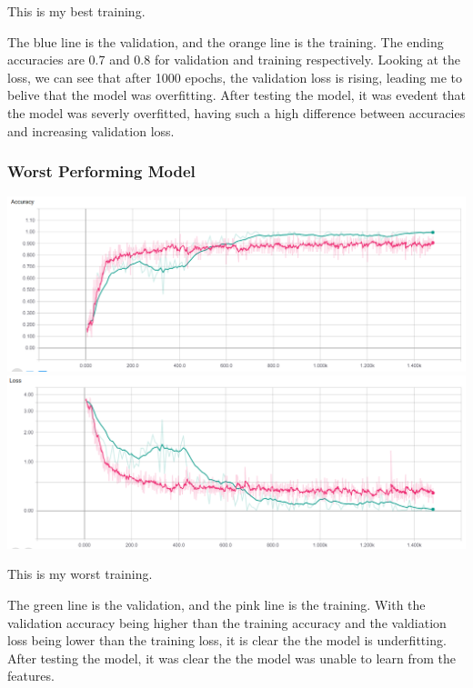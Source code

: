 \documentclass[11pt]{article}
\makeatletter
\def\maxwidth{\ifdim\Gin@nat@width>\linewidth\linewidth
    \else\Gin@nat@width\fi}
\let\Oldincludegraphics\includegraphics
\renewcommand{\includegraphics}[1]{\Oldincludegraphics[width=.8\maxwidth]{#1}}
\makeatother
\begin{document}
    This is my best training.

The blue line is the validation, and the orange line is the training.
The ending accuracies are 0.7 and 0.8 for validation and training
respectively. Looking at the loss, we can see that after 1000 epochs,
the validation loss is rising, leading me to belive that the model was
overfitting. After testing the model, it was evedent that the model was
severly overfitted, having such a high difference between accuracies and
increasing validation loss.

    \hypertarget{worst-performing-model}{%
\subsubsection{Worst Performing Model}\label{worst-performing-model}}

    \includegraphics{imgs/underfit_full_model_training_acc.png}
\includegraphics{imgs/underfit_full_model_training_loss.png}

    This is my worst training.

The green line is the validation, and the pink line is the training.
With the validation accuracy being higher than the training accuracy and
the valdiation loss being lower than the training loss, it is clear the
the model is underfitting. After testing the model, it was clear the the
model was unable to learn from the features.


    
    
    
    
\end{document}
